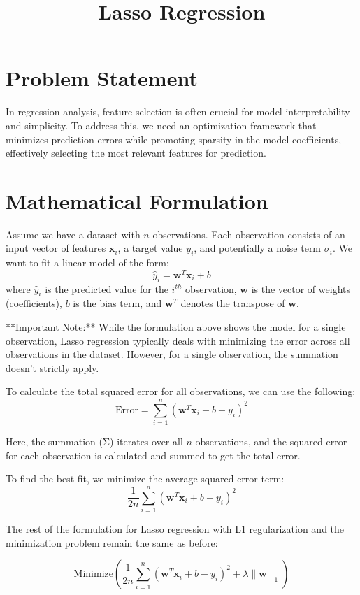 \documentclass{article}
\title{Lasso Regression}
\date{}
\begin{document}
\maketitle

\section*{Problem Statement}

In regression analysis, feature selection is often crucial for model interpretability and simplicity. To address this, we need an optimization framework that minimizes prediction errors while promoting sparsity in the model coefficients, effectively selecting the most relevant features for prediction.

\section*{Mathematical Formulation}

Assume we have a dataset with $n$ observations. Each observation consists of an input vector of features $\mathbf{x}_i$, a target value $y_i$, and potentially a noise term $\sigma_i$. We want to fit a linear model of the form:
\[
\hat{y}_i = \mathbf{w}^T \mathbf{x}_i + b
\]
where $\hat{y}_i$ is the predicted value for the $i^{th}$ observation, $\mathbf{w}$ is the vector of weights (coefficients), $b$ is the bias term, and $\mathbf{w}^T$ denotes the transpose of $\mathbf{w}$.

**Important Note:** While the formulation above shows the model for a single observation, Lasso regression typically deals with minimizing the error across all observations in the dataset. However, for a single observation, the summation doesn't strictly apply. 

To calculate the total squared error for all observations, we can use the following:
\[
\text{Error} = \sum_{i=1}^n (\mathbf{w}^T \mathbf{x}_i + b - y_i)^2
\]

Here, the summation (Σ) iterates over all $n$ observations, and the squared error for each observation is calculated and summed to get the total error.

To find the best fit, we minimize the average squared error term:
\[
\frac{1}{2n} \sum_{i=1}^n (\mathbf{w}^T \mathbf{x}_i + b - y_i)^2
\]

The rest of the formulation for Lasso regression with L1 regularization and the minimization problem remain the same as before:

\[
\text{Minimize} \left( \frac{1}{2n} \sum_{i=1}^n (\mathbf{w}^T \mathbf{x}_i + b - y_i)^2 + \lambda \|\mathbf{w}\|_1 \right)
\]
\end{document}
